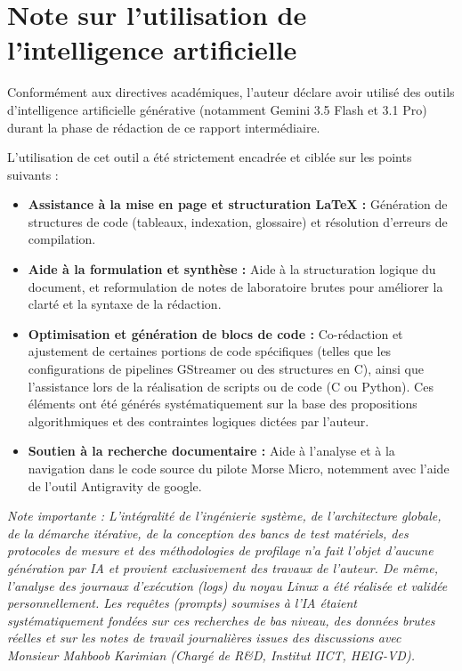 \section{Note sur l'utilisation de l'intelligence artificielle}
Conformément aux directives académiques, l'auteur déclare avoir utilisé des outils 
d'intelligence artificielle générative (notamment Gemini 3.5 Flash et 3.1 Pro) durant la 
phase de rédaction de ce rapport intermédiaire.

L'utilisation de cet outil a été strictement encadrée et ciblée sur les points suivants :
\begin{itemize}
    \item \textbf{Assistance à la mise en page et structuration LaTeX :} Génération de structures de code
    (tableaux, indexation, glossaire) et résolution d'erreurs de compilation.
    \item \textbf{Aide à la formulation et synthèse :} Aide à la structuration logique du document, et 
    reformulation de notes de laboratoire brutes pour améliorer la clarté et la syntaxe de la rédaction.
    \item \textbf{Optimisation et génération de blocs de code :} Co-rédaction et ajustement de certaines portions de 
    code spécifiques (telles que les configurations de pipelines GStreamer ou des structures en C), ainsi que l'assistance 
    lors de la réalisation de scripts ou de code (C ou Python). Ces éléments ont été générés 
    systématiquement sur la base des propositions algorithmiques et des contraintes logiques dictées par l'auteur.
    \item \textbf{Soutien à la recherche documentaire :} Aide à l'analyse et à la navigation dans le 
    code source du pilote Morse Micro, notemment avec l'aide de l'outil Antigravity de google.
\end{itemize}

\textit{Note importante : L'intégralité de l'ingénierie système, de l'architecture globale, de la démarche itérative, de 
la conception des bancs de test matériels, des protocoles de mesure et des méthodologies de profilage n'a fait l'objet d'aucune 
génération par IA et provient exclusivement des travaux de l'auteur. De même, l'analyse des journaux d'exécution (logs) du noyau 
Linux a été réalisée et validée personnellement. Les requêtes (prompts) soumises à l'IA étaient systématiquement fondées sur ces 
recherches de bas niveau, des données brutes réelles et sur les notes de travail journalières issues des discussions avec Monsieur 
Mahboob Karimian (Chargé de R\&D, Institut IICT, HEIG-VD).}